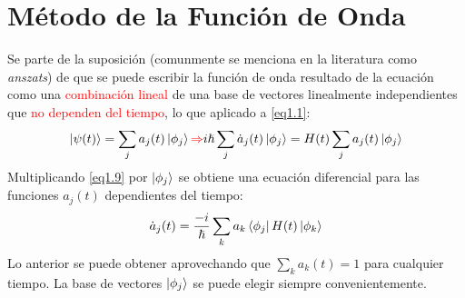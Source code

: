 \documentclass{book}
\begin{document}
\section{Método de la Función de Onda}
Se parte de la suposición (comunmente se menciona en la literatura como \textit{anszats}) de que se puede escribir la función de onda resultado de la ecuación como una \textcolor{red}{combinación lineal} de una base de vectores linealmente independientes que \textcolor{red}{no dependen del tiempo}, lo que aplicado a \ref{eq1.1}:
\begin{equation}\label{eq1.9}\ket{\psi(t)}=\sum_j a_j(t)\ket{\phi_j}\textcolor{red}{\Rightarrow} i\hslash \sum_j \dot{a}_j(t)\ket{\phi_j} = H(t)\sum_j a_j(t)\ket{\phi_j}  \end{equation}
Multiplicando \ref{eq1.9} por $\ket{\phi_j}$ se obtiene una ecuación diferencial para las funciones $a_j(t)$ dependientes del tiempo:
\begin{equation}\label{eq1.10} \dot{a}_j(t)=  \frac{-i}{\hslash}\sum_k a_k\bra{\phi_j}H(t)\ket{\phi_k}\end{equation}
Lo anterior se puede obtener aprovechando que $\sum_k a_k(t)=1$ para cualquier tiempo. La base de vectores $\ket{\phi_j}$ se puede elegir siempre convenientemente.
\end{document}
